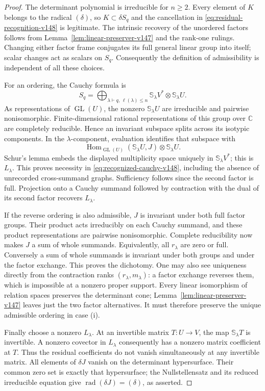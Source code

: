 \documentclass[11pt,reqno]{amsart}
\numberwithin{equation}{section}
\theoremstyle{definition}\newtheorem{definition}[theorem]{Definition}
\theoremstyle{remark}\newtheorem{remark}[theorem]{Remark}
\newcommand{\C}{\mathbb C}\newcommand{\Q}{\mathbb Q}
\DeclareMathOperator{\Hom}{Hom}\DeclareMathOperator{\Tot}{Tot}
\DeclareMathOperator{\rad}{rad}\DeclareMathOperator{\Ass}{Ass}
\begin{document}
\begin{proof}
The determinant polynomial is irreducible for \(n\ge2\).
Every element of \(K\) belongs to the radical \((\delta)\),
so \(K\subset\delta S_q\) and the cancellation in
\eqref{eq:residual-recognition-v148} is legitimate.  The intrinsic
recovery of the unordered factors follows from
Lemma~\ref{lem:linear-preserver-v147} and the rank-one rulings.
Changing either factor frame conjugates its full general linear
group into itself; scalar changes act as scalars on \(S_q\).
Consequently the definition of admissibility is independent of
all these choices.

For an ordering, the Cauchy formula is
\[
 S_q=\bigoplus_{\lambda\vdash q,\,\ell(\lambda)\le n}
      \mathbb S_\lambda V^*\otimes\mathbb S_\lambda U.
\]
As representations of \(\operatorname{GL}(U)\), the nonzero
\(\mathbb S_\lambda U\) are irreducible and pairwise
nonisomorphic.  Finite-dimensional rational representations of
this group over \(\C\) are completely reducible.  Hence an
invariant subspace splits across its isotypic components.  In the
\(\lambda\)-component, evaluation identifies that subspace with
\[
 \Hom_{\operatorname{GL}(U)}(\mathbb S_\lambda U,J)
                              \otimes\mathbb S_\lambda U.
\]
Schur's lemma embeds the displayed multiplicity space uniquely in
\(\mathbb S_\lambda V^*\); this is \(L_\lambda\).
This proves necessity in \eqref{eq:recognized-cauchy-v148},
including the absence of unrecorded cross-summand graphs.
Sufficiency follows since the second factor is full.  Projection
onto a Cauchy summand followed by contraction with the dual of its
second factor recovers \(L_\lambda\).

If the reverse ordering is also admissible, \(J\) is invariant
under both full factor groups.  Their product acts irreducibly on
each Cauchy summand, and these product representations are pairwise
nonisomorphic.  Complete reducibility now makes \(J\) a sum of
whole summands.  Equivalently, all \(r_\lambda\) are zero or
full.  Conversely a sum of whole summands is invariant under both
groups and under the factor exchange.  This proves the dichotomy.
One may also see uniqueness directly from the contraction ranks
\((r_\lambda,m_\lambda)\): a factor exchange reverses them,
which is impossible at a nonzero proper support.  Every linear
isomorphism of relation spaces preserves the determinant cone;
Lemma~\ref{lem:linear-preserver-v147} leaves just the two
factor alternatives.  It must therefore preserve the unique
admissible ordering in case (i).

Finally choose a nonzero \(L_\lambda\).  At an invertible
matrix \(T:U\to V\), the map \(\mathbb S_\lambda T\) is
invertible.  A nonzero covector in \(L_\lambda\) consequently
has a nonzero matrix coefficient at \(T\).  Thus the residual
coefficients do not vanish simultaneously at any invertible
matrix.  All elements of \(\delta J\) vanish on the determinant
hypersurface.  Their common zero set is exactly that hypersurface;
the Nullstellensatz and its reduced irreducible equation give
\(\rad(\delta J)=(\delta)\), as asserted.
\end{proof}
\end{document}
